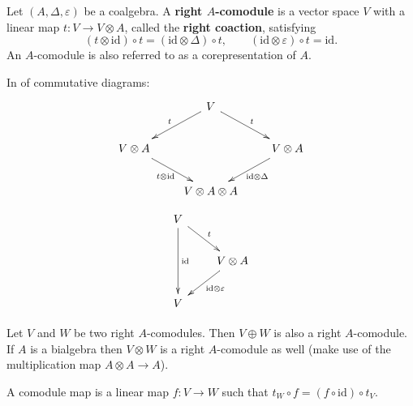 \documentclass[12pt]{article}
\newcommand*{\id}{\mathrm{id}}
\theoremstyle{inlinedefn}
\theoremstyle{break}
\newcommand*{\defn}[1]{\textbf{#1}}
\begin{document}
Let $(A,\Delta,\varepsilon)$ be a coalgebra.
A \textbf{right $A$-comodule} is a vector space $V$ with a linear map
$t\colon V \to V\otimes A$, called the \defn{right coaction}, satisfying
\begin{equation}
(t\otimes\id) \circ t = (\id\otimes\Delta) \circ t, \qquad
(\id\otimes\varepsilon) \circ t = \id.
\end{equation}
An $A$-comodule is also referred to as a corepresentation of $A$.

In  of commutative diagrams:
\[\begin{xy}
\xymatrix@R=20pt@C=20pt{
& *+<10pt>\txt{$V$} \ar_{t}[dl] \ar^{t}[dr] & \\
*+<10pt>\txt{$V\otimes A$} \ar_{t\otimes\id}[dr] & & *+<10pt>\txt{$V\otimes A$} \ar^{\id\otimes\Delta}[dl] \\
& *+<10pt>\txt{$V\otimes A\otimes A$} &
}\end{xy}\]
\[\begin{xy}
\xymatrix@R=20pt@C=20pt{
*+<10pt>\txt{$V$} \ar^{\id}[dd] \ar^{t}[dr] & \\
& *+<10pt>\txt{$V\otimes A$} \ar^{\id\otimes\varepsilon}[dl] \\
*+<10pt>\txt{$V$} &
}\end{xy}\]

Let $V$ and $W$ be two right $A$-comodules.
Then $V\oplus W$ is also a right $A$-comodule.
If $A$ is a bialgebra then $V\otimes W$ is a right $A$-comodule as well
(make use of the multiplication map $A\otimes A \to A$).

A comodule map is a linear map $f\colon V \to W$
such that $t_W\circ f = (f\circ\id)\circ t_V$.
\end{document}
